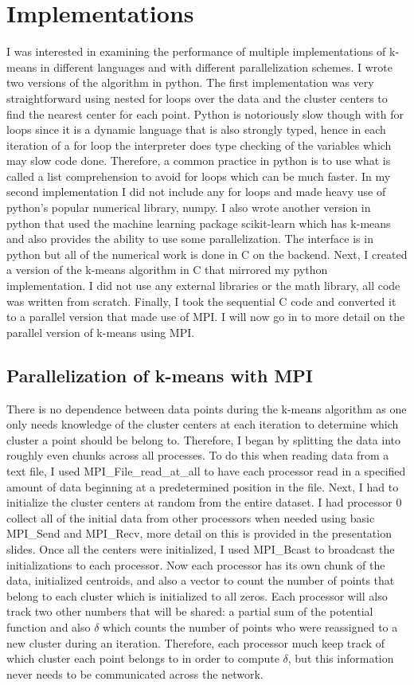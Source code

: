 \documentclass[10pt,twocolumn,letterpaper]{article}
\begin{document}
\section{Implementations}
I was interested in examining the performance of multiple implementations of k-means in different languages and with different parallelization schemes. I wrote two versions of the algorithm in python. The first implementation was very straightforward using nested for loops over the data and the cluster centers to find the nearest center for each point. Python is notoriously slow though with for loops since it is a dynamic language that is also strongly typed, hence in each iteration of a for loop the interpreter does type checking of the variables which may slow code done. Therefore, a common practice in python is to use what is called a list comprehension to avoid for loops which can be much faster. In my second implementation I did not include any for loops and made heavy use of python's popular numerical library, numpy. I also wrote another version in python that used the machine learning package scikit-learn which has k-means and also provides the ability to use some parallelization. The interface is in python but all of the numerical work is done in C on the backend. Next, I created a version of the k-means algorithm in C that mirrored my python implementation. I did not use any external libraries or the math library, all code was written from scratch. Finally, I took the sequential C code and converted it to a parallel version that made use of MPI. I will now go in to more detail on the parallel version of k-means using MPI.

\subsection{Parallelization of k-means with MPI}
There is no dependence between data points during the k-means algorithm as one only needs knowledge of the cluster centers at each iteration to determine which cluster a point should be belong to. Therefore, I began by splitting the data into roughly even chunks across all processes. To do this when reading data from a text file, I used MPI\_File\_read\_at\_all to have each processor read in a specified amount of data beginning at a predetermined position in the file. Next, I had to initialize the cluster centers at random from the entire dataset. I had processor $0$ collect all of the initial data from other processors when needed using basic MPI\_Send and MPI\_Recv, more detail on this is provided in the presentation slides. Once all the centers were initialized, I used MPI\_Bcast to broadcast the initializations to each processor. Now each processor has its own chunk of the data, initialized centroids, and also a vector to count the number of points that belong to each cluster which is initialized to all zeros. Each processor will also track two other numbers that will be shared: a partial sum of the potential function and also $\delta$ which counts the number of points who were reassigned to a new cluster during an iteration. Therefore, each processor much keep track of which cluster each point belongs to in order to compute $\delta$, but this information never needs to be communicated across the network. 
\end{document}
